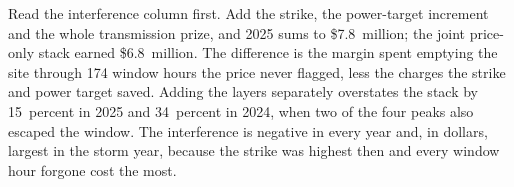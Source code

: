 Read the interference column first. Add the strike, the power-target increment and the whole transmission prize, and 2025 sums to \$7.8~million; the joint price-only stack earned \$6.8~million. The difference is the margin spent emptying the site through 174 window hours the price never flagged, less the charges the strike and power target saved. Adding the layers separately overstates the stack by 15~percent in 2025 and 34~percent in 2024, when two of the four peaks also escaped the window. %
The interference is negative in every year and, in dollars, largest in the storm year, because the strike was highest then and every window hour forgone cost the most.

